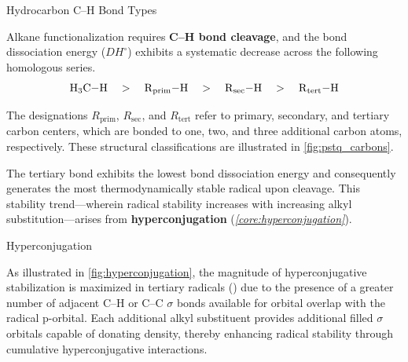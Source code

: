 \documentclass[10pt]{article}
\begin{document}
    \begin{core}{Hydrocarbon C--H Bond Types}

      Alkane functionalization requires \textbf{C--H bond cleavage}, and the bond dissociation energy ($DH^{\circ}$) exhibits a systematic decrease across the following homologous series.
      \[
        \ce{H3C-H} \quad > \quad \ce{R_{prim}-H} \quad > \quad \ce{R_{sec}-H} \quad > \quad \ce{R_{tert}-H}
      \]

      The designations $R_{\text{prim}}$, $R_{\text{sec}}$, and $R_{\text{tert}}$ refer to primary, secondary, and tertiary carbon centers, which are bonded to one, two, and three additional carbon atoms, respectively. These structural classifications are illustrated in \autoref{fig:pstq_carbons}.


      The tertiary  bond exhibits the lowest bond dissociation energy and consequently generates the most thermodynamically stable radical upon cleavage. This stability trend---wherein radical stability increases with increasing alkyl substitution---arises from \textbf{hyperconjugation} (\textit{\autoref{core:hyperconjugation}}).
      
    \end{core}

    \begin{core}[label=core:hyperconjugation]{Hyperconjugation}


      As illustrated in \autoref{fig:hyperconjugation}, the magnitude of hyperconjugative stabilization is maximized in tertiary radicals () due to the presence of a greater number of adjacent C--H or C--C $\sigma$ bonds available for orbital overlap with the radical p-orbital. Each additional alkyl substituent provides additional filled $\sigma$ orbitals capable of donating  density, thereby enhancing radical stability through cumulative hyperconjugative interactions.

    \end{core}
\end{document}
